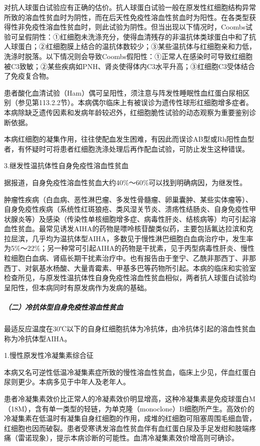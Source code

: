对抗人球蛋白试验应有正确的估价。抗人球蛋白试验一般在原发性红细胞结构异常所致的溶血性贫血时为阴性，而在后天性免疫性溶血性贫血时为阳性。在各类型获得性非免疫性溶血性贫血时，则此试验为阴性。但当出现以下情况时，Coombs试验可呈假阴性：①红细胞未洗涤充分，使得血清残存的非温抗体类球蛋白中和了抗人球蛋白；②红细胞膜上结合的温抗体数较少；③某些温抗体与红细胞亲和力低，洗涤时脱落。以下情况则会导致Coombs假阳性：①正常人在感染时可导致红细胞被C3致敏；②某些疾病如PNH、肾炎使得体内C3水平升高；③红细胞C3受体结合了免疫复合物。

患者酸化血清试验（Ham）偶可呈阳性，须注意与阵发性睡眠性血红蛋白尿相区别（参见第113.2.2节）。本病偶尔临床上有被误诊为遗传性球形红细胞增多症者。本病除缺乏遗传因素和发病年龄较迟外，红细胞脆性试验的动态观察为重要鉴别诊断依据。

本病红细胞的凝集作用，往往使配血发生困难，有因此而误诊AB型或Rh阳性血型者，有怀疑时可将患者红细胞洗涤处理后再作配血试验，可防止发生这种错误。

\hypertarget{text00260.htmlux5cux23CHP33-5-4-1-1-1-3}{}
3.继发性温抗体性自身免疫性溶血性贫血

据报道，自身免疫性溶血性贫血大约40\%～60\%可以找到明确病因，为继发性。

肿瘤性疾病（白血病、恶性淋巴瘤、多发性骨髓瘤、卵巢囊肿、某些实体瘤等）、自身免疫性疾病（系统性红斑狼疮、类风湿关节炎、溃疡性结肠炎、自身免疫性甲状腺炎等）及感染（传染性单核细胞增多症、病毒性肝炎、结核病等）均可引起溶血性贫血。最常见诱发AIHA的药物是嘌呤核苷酸类似药，主要包括氟达拉滨和克拉屈滨，几乎均为温抗体型AIHA，多数见于慢性淋巴细胞白血病治疗中，发生率为5\%～22\%；另一种常可引起AIHA的药物是干扰素，见于丙型病毒性肝炎、慢性粒细胞白血病、肾癌长期干扰素治疗中。也有报告由于奎宁、乙酰非那西丁、非那西丁、对氨基水杨酸、大量青霉素、甲基多巴等药物所引起。本病的临床和实验室检查所见，与原发性温抗体性自身免疫性溶血性贫血相似，两者抗人球蛋白试验均呈阳性，但本病同时有原发病作为发病的基础。

\subparagraph{（二）冷抗体型自身免疫性溶血性贫血}

最适反应温度在30℃以下的自身红细胞抗体为冷抗体，由冷抗体引起的溶血性贫血称为冷抗体型AIHA。

\hypertarget{text00260.htmlux5cux23CHP33-5-4-1-1-2-1}{}
1.慢性原发性冷凝集素综合征

本病又名可逆性低温冷凝集素症所致的慢性溶血性贫血，临床上少见，伴血红蛋白尿则更少。本病多见于中年人及老年人。

患者冷凝集素效价比正常人的冷凝素效价明显增高，这种冷凝集素是免疫球蛋白M
（18M），含有单一类型的轻链，为单克隆（monoclone）B细胞所产生。高效价的冷凝集素在低温时有凝集自身红细胞的作用，成堆的红细胞可阻塞周围毛细血管，红细胞也因而破裂。患者受寒诱发溶血性贫血伴有血红蛋白尿及手足发绀和肢端疼痛（雷诺现象），提示本病诊断的可能性。血清冷凝集素效价增高则可确诊。

